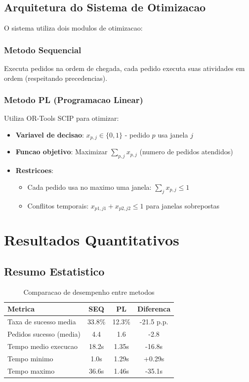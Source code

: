 \documentclass[12pt,a4paper]{article}
\begin{document}
\subsection{Arquitetura do Sistema de Otimizacao}

O sistema utiliza dois modulos de otimizacao:

\subsubsection{Metodo Sequencial}
Executa pedidos na ordem de chegada, cada pedido executa suas atividades em ordem (respeitando precedencias).

\subsubsection{Metodo PL (Programacao Linear)}
Utiliza OR-Tools SCIP para otimizar:
\begin{itemize}
    \item \textbf{Variavel de decisao}: $x_{p,j} \in \{0,1\}$ - pedido $p$ usa janela $j$
    \item \textbf{Funcao objetivo}: Maximizar $\sum_{p,j} x_{p,j}$ (numero de pedidos atendidos)
    \item \textbf{Restricoes}:
    \begin{itemize}
        \item Cada pedido usa no maximo uma janela: $\sum_j x_{p,j} \leq 1$
        \item Conflitos temporais: $x_{p1,j1} + x_{p2,j2} \leq 1$ para janelas sobrepostas
    \end{itemize}
\end{itemize}

\section{Resultados Quantitativos}

\subsection{Resumo Estatistico}

\begin{table}[H]
\centering
\caption{Comparacao de desempenho entre metodos}
\begin{tabular}{lccc}
\toprule
\textbf{Metrica} & \textbf{SEQ} & \textbf{PL} & \textbf{Diferenca} \\
\midrule
Taxa de sucesso media & 33.8\% & 12.3\% & -21.5 p.p. \\
Pedidos sucesso (media) & 4.4 & 1.6 & -2.8 \\
Tempo medio execucao & 18.2s & 1.35s & \textcolor{success}{-16.8s} \\
Tempo minimo & 1.0s & 1.29s & +0.29s \\
Tempo maximo & 36.6s & 1.46s & \textcolor{success}{-35.1s} \\
\bottomrule
\end{tabular}
\end{table}
\end{document}
